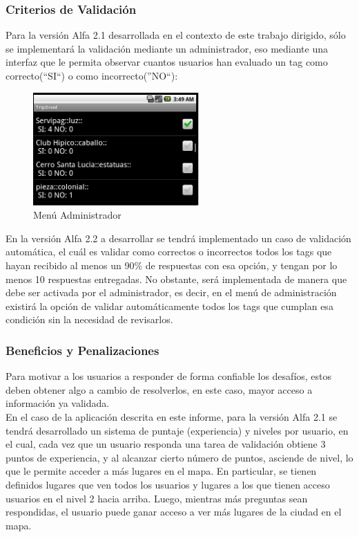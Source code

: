 \documentclass[10pt,letterpaper]{article}
\begin{document}
\newpage
\subsubsection{Criterios de Validación}

Para la versión Alfa 2.1 desarrollada en el contexto de este trabajo dirigido, sólo se implementará la validación mediante un administrador, eso mediante una interfaz que le permita observar cuantos usuarios han evaluado un tag como correcto(``SI``) o como incorrecto(''NO``):\\

\begin{figure}[h]
\begin{center}
\includegraphics[width=180pt]{./imgs/TripdroidAdmin2.png}
\caption{Menú Administrador}
\end{center}
\end{figure}

En la versión Alfa 2.2 a desarrollar se tendrá implementado un caso de validación automática, el cuál es validar como correctos o incorrectos todos los tags que hayan recibido al menos un 90\% de respuestas con esa opción, y tengan por lo menos 10 respuestas entregadas. No obstante, será implementada de manera que debe ser activada por el administrador, es decir, en el menú de administración  existirá la opción de validar automáticamente todos los tags que cumplan esa condición sin la necesidad de revisarlos.\\

\subsubsection{Beneficios y Penalizaciones}

Para motivar a los usuarios a responder de forma confiable los desafíos, estos deben obtener algo a cambio de resolverlos, en este caso, mayor acceso a información ya validada.\\

En el caso de la aplicación descrita en este informe, para la versión Alfa 2.1 se tendrá desarrollado un sistema de puntaje (experiencia) y niveles por usuario, en el cual, cada vez que un usuario responda una tarea de validación obtiene 3 puntos de experiencia, y al alcanzar cierto número de puntos, asciende de nivel, lo que le permite acceder a más lugares en el mapa. En particular, se tienen definidos lugares que ven todos los usuarios y lugares a los que tienen acceso usuarios en el nivel 2 hacia arriba. Luego, mientras más preguntas sean respondidas, el usuario puede ganar acceso a ver más lugares de la ciudad en el mapa.\\
\end{document}
